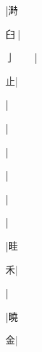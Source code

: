 \begin{multicols}{2}
{{}|{\cjk{}溡}\par
{\cjk{}{\cnsym{}　}臼{\cnjzr{}}}|{}\par
{\cjk{}亅{\cnsym{}　}{\cnsym{}　}}|{}\par
{\cjk{}{\cnsym{}　}{\cnsym{}　}止}|{}\par
{}|{}\par
{\cjk{}{\cnsym{}　}{\cnsym{}　}{\cnsym{}　}}|{}\par
{\cjk{}{\cnsym{}　}{\cnsym{}　}{\cnsym{}　}}|{}\par
{\cjk{}{\cnsym{}　}{\cnsym{}　}{\cnsym{}　}}|{}\par
{\cjk{}{\cnsym{}　}{\cnsym{}　}{\cnsym{}　}}|{}\par
{\cjk{}{\cnsym{}　}{\cnsym{}　}{\cnsym{}　}}|{}\par
{\cjk{}{\cnsym{}　}{\cnsym{}　}{\cnsym{}　}}|{\cjk{}晆}\par
{\cjk{}{\cnsym{}　}{\cnsym{}　}禾}|{}\par
{\cjk{}{\cnsym{}　}{\cnsym{}　}{\cnsym{}　}}|{}\par
{\cjk{}{\cnsym{}　}{\cnsym{}　}{\cnsym{}　}}|{\cjk{}曉}\par
{\cjk{}{\cnsym{}　}{\cnsym{}　}金}|{}\par
}
\end{multicols}
